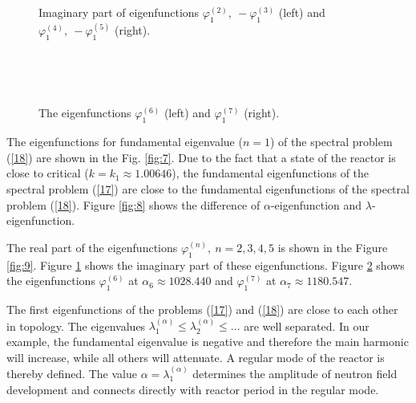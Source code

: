 \documentclass[authoryear]{elsarticle}
\begin{document}
\begin{figure}[!h]
  \begin{center}
\begin{minipage}{0.49\linewidth}
 \\
\end{minipage}
\hfill
\begin{minipage}{0.49\linewidth}
 \\
\end{minipage}
\caption{Imaginary part of eigenfunctions $\varphi^{(2)}_1, \ - \varphi^{(3)}_1$ (left) and $\varphi^{(4)}_1, \ - \varphi^{(5)}_1$ (right).}
\label{fig:10}
  \end{center}
\end{figure}
\begin{figure}[!h]
  \begin{center}
\begin{minipage}{0.49\linewidth}
 \\
\end{minipage}
\hfill
\begin{minipage}{0.49\linewidth}
 \\
\end{minipage}
\caption{The eigenfunctions $\varphi^{(6)}_1$ (left) and $\varphi^{(7)}_1$ (right).}
\label{fig:11}
  \end{center}
\end{figure}

The eigenfunctions for fundamental eigenvalue ($n=1$) of the spectral problem (\ref{18}) are shown in the Fig. \ref{fig:7}. Due to the fact that a state of the reactor is close to critical ($k = k_1 \approx  1.00646$), the fundamental eigenfunctions of the spectral problem (\ref{17}) are close to the fundamental eigenfunctions of the spectral problem (\ref{18}).
Figure \ref{fig:8} shows the difference of $\alpha$-eigenfunction and $\lambda$-eigenfunction.  


The real part of the eigenfunctions $\varphi^{(n)}_1, \ n = 2,3,4,5$ is shown in the Figure \ref{fig:9}.
Figure \ref{fig:10} shows the imaginary part of these eigenfunctions.
Figure \ref{fig:11} shows the eigenfunctions $\varphi^{(6)}_1$ at $\alpha_6 \approx  1028.440$ and 
$\varphi^{(7)}_1$ at $\alpha_7 \approx  1180.547$.

The first eigenfunctions of the problems (\ref{17}) and (\ref{18}) are close to each other in topology.
The eigenvalues $\lambda_1^{(\alpha)} \leq  \lambda_2^{(\alpha)} \leq ...$
are well separated. In our example, the fundamental eigenvalue is negative and therefore the main harmonic will increase, while all others will attenuate. A regular mode of the reactor is thereby defined. The value $\alpha = \lambda_1^{(\alpha)}$ determines the amplitude of neutron field development and connects directly with reactor period in the regular mode.
\end{document}
